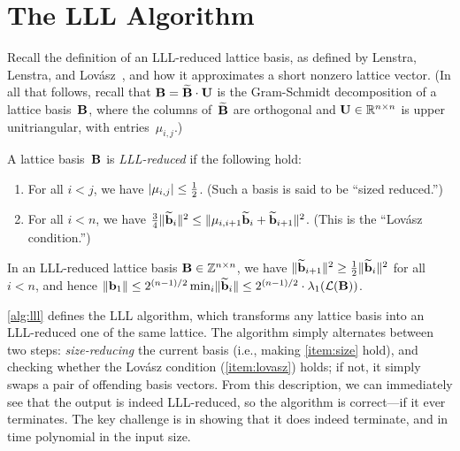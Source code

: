 \documentclass[11pt]{article}
\begin{document}
\thispagestyle{fancy} %


\section{The LLL Algorithm}
\label{sec:lll-algorithm}

Recall the definition of an LLL-reduced lattice basis, as defined by
Lenstra, Lenstra, and Lov{\'a}sz~\cite{lenstra82:_factor}, and how it
approximates a short nonzero lattice vector. (In all that follows,
recall that $\mathbf{B} = \widetilde{\mathbf{B}} \cdot \mathbf{U}$ is the Gram-Schmidt
decomposition of a lattice basis~$\mathbf{B}$, where the columns
of~$\widetilde{\mathbf{B}}$ are orthogonal and $\mathbf{U} \in \mathbb{R}^{n \times n}$ is
upper unitriangular, with entries~$\mu_{i,j}$.)

\begin{definition}
  \label{def:lll}
  A lattice basis~$\mathbf{B}$ is \emph{LLL-reduced} if the following hold:
  \begin{enumerate}
  \item For all $i < j$, we have
    $\lvert\mu_{i,j}\rvert \leq \frac{1}{2}$.\label{item:size}
    \hfill (Such a basis is said to be ``sized reduced.'')
    
  \item For all $i < n$, we have
    $\frac{3}{4}\lVert \widetilde{\mathbf{b}}_i\rVert^2 \leq
    \lVert\mu_{i,i+1}\widetilde{\mathbf{b}}_i +
      \widetilde{\mathbf{b}}_{i+1}\rVert^2$.\label{item:lovasz}
    \hfill (This is the ``Lov{\'a}sz condition.'')
  \end{enumerate}
\end{definition}

\begin{lemma}
  \label{lem:lll-gs}
  In an LLL-reduced lattice basis $\mathbf{B} \in \mathbb{Z}^{n \times n}$, we have
  $\lVert\widetilde{\mathbf{b}}_{i+1}\rVert^{2} \geq \frac12
  \lVert\widetilde{\mathbf{b}}_{i}\rVert^{2}$ for all $i < n$, and hence
  $\lVert\mathbf{b}_1\rVert \leq 2^{(n-1)/2} \min_{i} \lVert\widetilde{\mathbf{b}}_{i}\rVert
  \leq 2^{(n-1)/2} \cdot \lambda_{1}(\mathcal{L}(\mathbf{B}))$.
\end{lemma}

\cref{alg:lll} defines the LLL algorithm, which transforms any lattice
basis into an LLL-reduced one of the same lattice. The algorithm
simply alternates between two steps: \emph{size-reducing} the current
basis (i.e., making \cref{item:size} hold), and checking whether the
Lov{\'a}sz condition (\cref{item:lovasz}) holds; if not, it simply
swaps a pair of offending basis vectors. From this description, we can
immediately see that the output is indeed LLL-reduced, so the
algorithm is correct---if it ever terminates. The key challenge is in
showing that it does indeed terminate, and in time polynomial in the
input size.
\end{document}
